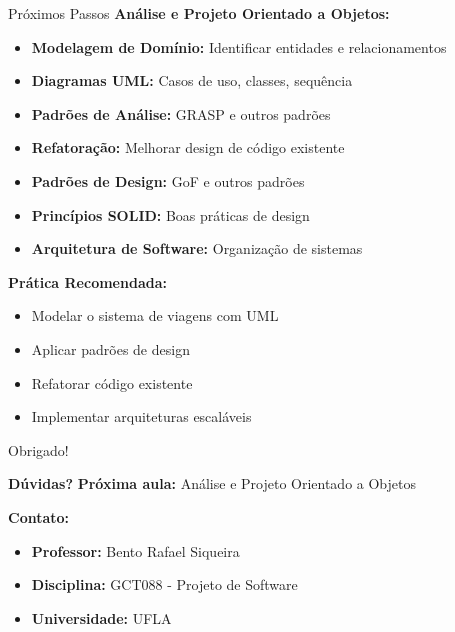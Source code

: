 \documentclass[aspectratio=169]{beamer}
\begin{document}
\begin{frame}{Próximos Passos}
\textbf{Análise e Projeto Orientado a Objetos:}
\begin{itemize}
    \item \textbf{Modelagem de Domínio:} Identificar entidades e relacionamentos
    \item \textbf{Diagramas UML:} Casos de uso, classes, sequência
    \item \textbf{Padrões de Análise:} GRASP e outros padrões
    \item \textbf{Refatoração:} Melhorar design de código existente
    \item \textbf{Padrões de Design:} GoF e outros padrões
    \item \textbf{Princípios SOLID:} Boas práticas de design
    \item \textbf{Arquitetura de Software:} Organização de sistemas
\end{itemize}

\textbf{Prática Recomendada:}
\begin{itemize}
    \item Modelar o sistema de viagens com UML
    \item Aplicar padrões de design
    \item Refatorar código existente
    \item Implementar arquiteturas escaláveis
\end{itemize}
\end{frame}

\begin{frame}{Obrigado!}
\begin{center}
\Large \textbf{Dúvidas?}
\vspace{1cm}
\normalsize
\textbf{Próxima aula:} Análise e Projeto Orientado a Objetos
\end{center}

\textbf{Contato:}
\begin{itemize}
    \item \textbf{Professor:} Bento Rafael Siqueira
    \item \textbf{Disciplina:} GCT088 - Projeto de Software
    \item \textbf{Universidade:} UFLA
\end{itemize}
\end{frame}
\end{document}
